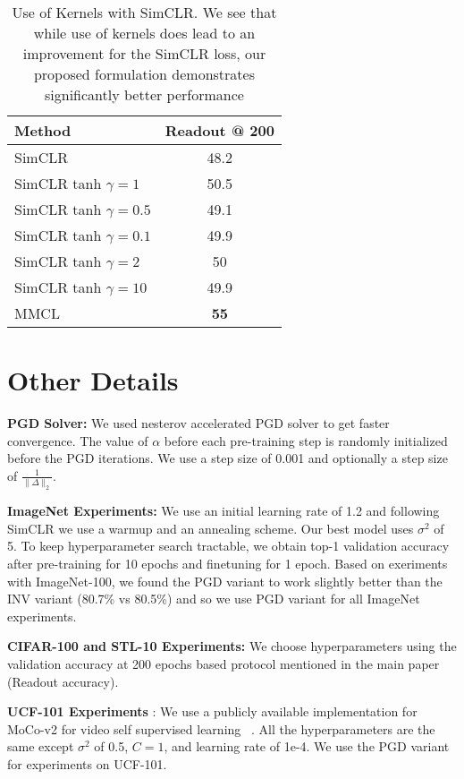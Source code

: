 \documentclass[letterpaper]{article} \usepackage{aaai22}  \usepackage{times}  \usepackage{helvet}  \usepackage{courier}  \usepackage[hyphens]{url}  \usepackage{graphicx} \urlstyle{rm} \def\UrlFont{\rm}  \usepackage{natbib}  \usepackage{caption} \DeclareCaptionStyle{ruled}{labelfont=normalfont,labelsep=colon,strut=off} \frenchspacing  \setlength{\pdfpagewidth}{8.5in}  \setlength{\pdfpageheight}{11in}
\begin{document}
\begin{table}[]
    \centering
    \begin{tabular}{l|c}
    \toprule
        Method & Readout @ 200 \\
        \midrule
        SimCLR & 48.2 \\
        SimCLR tanh $\gamma=1$ & 50.5 \\
        SimCLR tanh $\gamma=0.5$ & 49.1 \\
        SimCLR tanh $\gamma=0.1$ & 49.9 \\
        SimCLR tanh $\gamma=2$ & 50 \\
        SimCLR tanh $\gamma=10$ & 49.9 \\
        MMCL & \textbf{55} \\
        \bottomrule
    \end{tabular}
    \caption{Use of Kernels with SimCLR. We see that while use of kernels does lead to an improvement for the SimCLR loss, our proposed formulation demonstrates significantly better performance }
    \label{tab: kernel_simclr}
\end{table}

\section{Other Details}
\noindent\textbf{PGD Solver:} We used nesterov accelerated PGD solver to get faster convergence. The value of $\alpha$ before each pre-training step is randomly initialized before the PGD iterations. We use a step size of 0.001 and optionally a step size of $\frac{1}{\|\Delta\|_2}$.

\noindent\textbf{ImageNet Experiments:} We use an initial learning rate of 1.2 and following SimCLR we use a warmup and an annealing scheme. Our best model uses $\sigma^2$ of 5. To keep hyperparameter search tractable, we obtain top-1 validation accuracy after pre-training for 10 epochs and finetuning for 1 epoch. Based on exeriments with ImageNet-100, we found the PGD variant to work slightly better than the INV variant (80.7\% vs 80.5\%) and so we use PGD variant for all ImageNet experiments. 

\noindent\textbf{CIFAR-100 and STL-10 Experiments:} We choose hyperparameters using the validation accuracy at 200 epochs based protocol mentioned in the main paper (Readout accuracy).

\noindent\textbf{UCF-101 Experiments} : We use a publicly available implementation for MoCo-v2 for video self supervised learning ~\cite{NEURIPS2020_3def184a}. All the hyperparameters are the same except $\sigma^2$ of 0.5, $C=1$, and learning rate of 1e-4. We use the PGD variant for experiments on UCF-101. 
\end{document}
